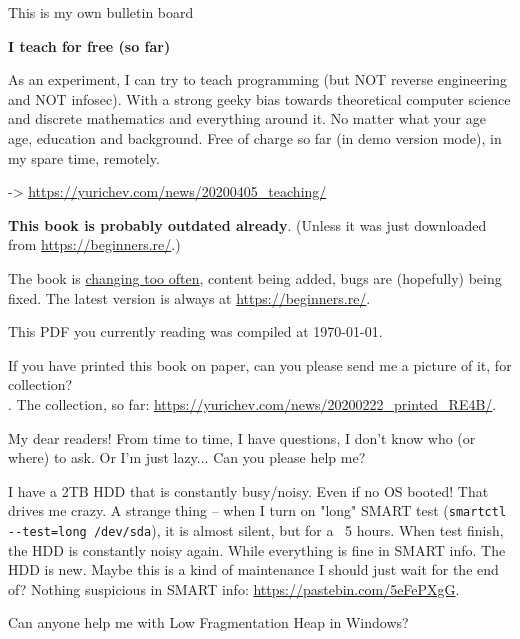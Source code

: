 
\begin{center}
\LARGE{} This is my own bulletin board \normalsize{}
\end{center}

\textbf{I teach for free (so far)}

As an experiment, I can try to teach programming (but NOT reverse engineering and NOT infosec). With a strong geeky bias towards theoretical computer science and discrete mathematics and everything around it. No matter what your age age, education and background. Free of charge so far (in demo version mode), in my spare time, remotely.

-> \url{https://yurichev.com/news/20200405_teaching/}

\myhrule{}

\textbf{This book is probably outdated already}.
(Unless it was just downloaded from \url{https://beginners.re/}.)

The book is \href{\RepoURL/ChangeLog}{changing too often},
content being added, bugs are (hopefully) being fixed.
The latest version is always at \url{https://beginners.re/}.

This PDF you currently reading was compiled at \today{}.

\myhrule{}

If you have printed this book on paper, can you please send me a picture of it, for collection?\\
\EMAILS{}.
The collection, so far: \url{https://yurichev.com/news/20200222_printed_RE4B/}.

\myhrule{}

My dear readers! From time to time, I have questions, I don't know who (or where) to ask.
Or I'm just lazy...
Can you please help me?

\myhrule{}

I have a 2TB HDD that is constantly busy/noisy.
Even if no OS booted!
That drives me crazy.
A strange thing -- when I turn on "long" SMART test (\verb|smartctl --test=long /dev/sda|),
it is almost silent, but for a ~5 hours.
When test finish, the HDD is constantly noisy again.
While everything is fine in SMART info.
The HDD is new.
Maybe this is a kind of maintenance I should just wait for the end of?
Nothing suspicious in SMART info: \url{https://pastebin.com/5eFePXgG}.

\myhrule{}

Can anyone help me with Low Fragmentation Heap in Windows?

